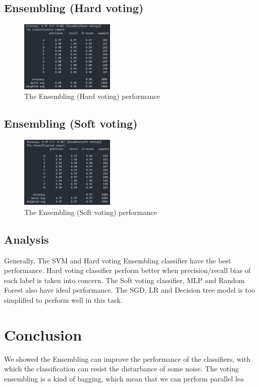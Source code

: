 \documentclass[11pt,en]{elegantpaper}
\begin{document}
\subsection*{Ensembling (Hard voting)}
\begin{figure}[H]
	\centering
	\includegraphics[width=0.4\textwidth]{image/hvpf}
	\caption{The Ensembling (Hard voting) performance}
	\label{hvpf}
\end{figure}

\subsection*{Ensembling (Soft voting)}
\begin{figure}[H]
	\centering
	\includegraphics[width=0.4\textwidth]{image/svpf}
	\caption{The Ensembling (Soft voting) performance}
	\label{svpf}
\end{figure}

\subsection{Analysis}
Generally, The SVM and Hard voting Ensembling classifier have the best performance. Hard voting classifier perform better when precision/recall bias of each label is taken into concern. The Soft voting classifier, MLP and Random Forest also have ideal performance. The SGD, LR and Decision tree model is too simplified to perform well in this task.

\section{Conclusion}
We showed the Ensembling can improve the performance of the classifiers, with which the classification can resist the disturbance of some noise. The voting ensembling is a kind of bagging, which mean that we can perform parallel lea



\end{document}
